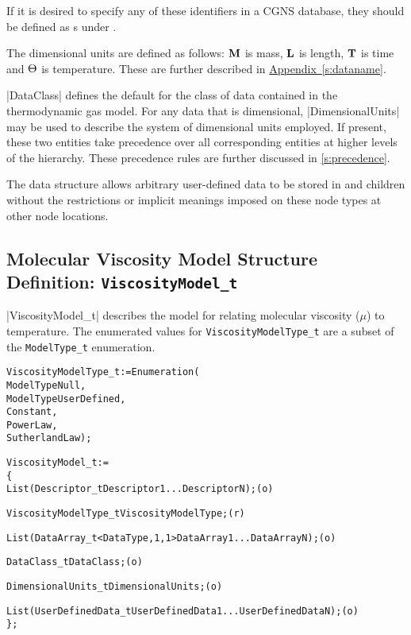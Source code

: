 If it is desired to specify any of these identifiers in a CGNS database,
they should be defined as s under .

The dimensional units are defined as follows: ${\bf M}$ is mass, ${\bf L}$ is length,
${\bf T}$ is time and ${\Theta}$ is temperature.  These are further
described in \hyperref[s:dataname]{Appendix~\ref*{s:dataname}}.

|DataClass| defines the default for the class of data contained in the
thermodynamic gas model.  For any data that is dimensional,
|DimensionalUnits| may be used to describe the system of dimensional units
employed.  If present, these two entities take precedence over all
corresponding entities at higher levels of the hierarchy.
These precedence rules are further discussed in \autoref{s:precedence}.

The  data structure allows arbitrary
user-defined data to be stored in  and
 children without the restrictions or implicit
meanings imposed on these node types at other node locations.

\subsection{Molecular Viscosity Model Structure Definition: \texttt{ViscosityModel\_t}} 

|ViscosityModel_t| describes the model for relating molecular
viscosity ($\mu$) to temperature.
The enumerated values for \texttt{ViscosityModelType\_t} are a subset of the
\texttt{ModelType\_t} enumeration.
\begin{alltt}
  ViscosityModelType\_t := Enumeration(
    ModelTypeNull,
    ModelTypeUserDefined,
    Constant,
    PowerLaw,
    SutherlandLaw ) ;

  ViscosityModel\_t :=
    \{
    List( Descriptor\_t Descriptor1 ... DescriptorN ) ;                      (o)

    ViscosityModelType\_t ViscosityModelType ;                               (r)
    
    List( DataArray\_t<DataType, 1, 1> DataArray1 ... DataArrayN ) ;         (o)

    DataClass\_t DataClass ;                                                 (o)
                
    DimensionalUnits\_t DimensionalUnits ;                                   (o)

    List( UserDefinedData\_t UserDefinedData1 ... UserDefinedDataN ) ;       (o)
    \} ;
\end{alltt}

